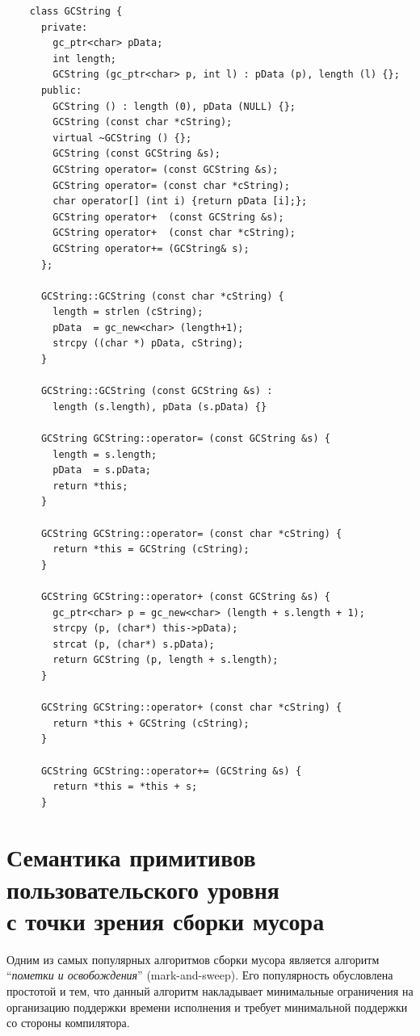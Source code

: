 \begin{lstlisting}
    class GCString {
      private:
        gc_ptr<char> pData; 	
        int length;	 
        GCString (gc_ptr<char> p, int l) : pData (p), length (l) {};     
      public:
        GCString () : length (0), pData (NULL) {};
        GCString (const char *cString);
        virtual ~GCString () {};
        GCString (const GCString &s);
        GCString operator= (const GCString &s);
        GCString operator= (const char *cString);
        char operator[] (int i) {return pData [i];};
        GCString operator+  (const GCString &s);
        GCString operator+  (const char *cString);
        GCString operator+= (GCString& s);
      };

      GCString::GCString (const char *cString) {
        length = strlen (cString);
        pData  = gc_new<char> (length+1);
        strcpy ((char *) pData, cString);
      }

      GCString::GCString (const GCString &s) : 
        length (s.length), pData (s.pData) {}

      GCString GCString::operator= (const GCString &s) {
        length = s.length;
        pData  = s.pData;
        return *this;
      }

      GCString GCString::operator= (const char *cString) {
        return *this = GCString (cString);
      }

      GCString GCString::operator+ (const GCString &s) {
        gc_ptr<char> p = gc_new<char> (length + s.length + 1);
        strcpy (p, (char*) this->pData);
        strcat (p, (char*) s.pData);
        return GCString (p, length + s.length);
      }

      GCString GCString::operator+ (const char *cString) {
        return *this + GCString (cString);
      }

      GCString GCString::operator+= (GCString &s) {
        return *this = *this + s;
      }
\end{lstlisting}

\section{Семантика примитивов\\
пользовательского уровня\\
с точки зрения сборки мусора}

Одним из самых популярных алгоритмов сборки мусора является  алгоритм ``\emph{пометки и 
освобождения}'' (mark-and-sweep). Его популярность обусловлена простотой и тем, что 
данный алгоритм накладывает минимальные ограничения на организацию поддержки времени
исполнения и требует минимальной поддержки со стороны компилятора. 

